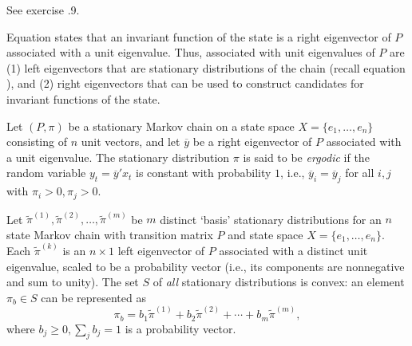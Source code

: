 \endtheorem

\proof See exercise \the\chapternum.9.  
\endproof





Equation 
  states that an invariant function of the state is
a right eigenvector of $P$ associated with a unit eigenvalue.
Thus, associated with unit eigenvalues of $P$ are (1) left eigenvectors that are stationary distributions of the chain (recall equation ),
and (2) right eigenvectors that can be used to construct  candidates for  invariant functions of the state. %


  Let $(P, \pi)$ be a stationary Markov chain on a  state space $X = \{e_1, \ldots, e_n\}$ consisting
of $n$ unit vectors, and let $\overline y$ be a right eigenvector of $P$ associated with a unit eigenvalue.
The stationary distribution $\pi$ is  said to be {\it ergodic\/} if the  random variable  $y_t = \overline y' x_t$
 is constant with probability $1$, i.e.,
$\overline y_i = \overline y_j$ for all $i, j$ with $\pi_i >0, \pi_j >0$.
\enddefinition

\medskip

  Let $\tilde \pi^{(1)}, \tilde \pi^{(2)}, \ldots, \tilde \pi^{(m)}$ be
$m$ distinct `basis' stationary distributions for an $n$ state Markov chain with transition matrix
$P$ and state space $X= \{e_1, \ldots, e_n\}$.  Each $\tilde \pi^{(k)}$ is an $n \times 1$  left eigenvector of $P$ associated with a distinct
unit eigenvalue, %
scaled to be a probability vector (i.e., its components are nonnegative and sum to unity).
The set $S$ of {\it all\/} stationary distributions is convex: an element $\pi_b \in S$   can  be represented
as
$$ \pi_b =   b_1 \tilde \pi^{(1)} + b_2 \tilde \pi^{(2)} +  \cdots + b_m \tilde \pi^{(m)} , $$
where $b_j \geq 0, \sum_j b_j =1$ is a probability vector.

